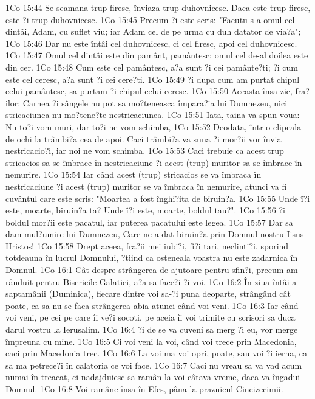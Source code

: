 1Co 15:44  Se seamana trup firesc, înviaza trup duhovnicesc. Daca este trup firesc, este ?i trup duhovnicesc.
1Co 15:45  Precum ?i este scris: "Facutu-s-a omul cel dintâi, Adam, cu suflet viu; iar Adam cel de pe urma cu duh datator de via?a";
1Co 15:46  Dar nu este întâi cel duhovnicesc, ci cel firesc, apoi cel duhovnicesc.
1Co 15:47  Omul cel dintâi este din pamânt, pamântesc; omul cel de-al doilea este din cer.
1Co 15:48  Cum este cel pamântesc, a?a sunt ?i cei pamânte?ti; ?i cum este cel ceresc, a?a sunt ?i cei cere?ti.
1Co 15:49  ?i dupa cum am purtat chipul celui pamântesc, sa purtam ?i chipul celui ceresc.
1Co 15:50  Aceasta însa zic, fra?ilor: Carnea ?i sângele nu pot sa mo?teneasca împara?ia lui Dumnezeu, nici stricaciunea nu mo?tene?te nestricaciunea.
1Co 15:51  Iata, taina va spun voua: Nu to?i vom muri, dar to?i ne vom schimba,
1Co 15:52  Deodata, într-o clipeala de ochi la trâmbi?a cea de apoi. Caci trâmbi?a va suna ?i mor?ii vor învia nestricacio?i, iar noi ne vom schimba.
1Co 15:53  Caci trebuie ca acest trup stricacios sa se îmbrace în nestricaciune ?i acest (trup) muritor sa se îmbrace în nemurire.
1Co 15:54  Iar când acest (trup) stricacios se va îmbraca în nestricaciune ?i acest (trup) muritor se va îmbraca în nemurire, atunci va fi cuvântul care este scris: "Moartea a fost înghi?ita de biruin?a.
1Co 15:55  Unde î?i este, moarte, biruin?a ta? Unde î?i este, moarte, boldul tau?".
1Co 15:56  ?i boldul mor?ii este pacatul, iar puterea pacatului este legea.
1Co 15:57  Dar sa dam mul?umire lui Dumnezeu, Care ne-a dat biruin?a prin Domnul nostru Iisus Hristos!
1Co 15:58  Drept aceea, fra?ii mei iubi?i, fi?i tari, neclinti?i, sporind totdeauna în lucrul Domnului, ?tiind ca osteneala voastra nu este zadarnica în Domnul.
1Co 16:1  Cât despre strângerea de ajutoare pentru sfin?i, precum am rânduit pentru Bisericile Galatiei, a?a sa face?i ?i voi.
1Co 16:2  În ziua întâi a saptamânii (Duminica), fiecare dintre voi sa-?i puna deoparte, strângând cât poate, ca sa nu se faca strângerea abia atunci când voi veni.
1Co 16:3  Iar când voi veni, pe cei pe care îi ve?i socoti, pe aceia îi voi trimite cu scrisori sa duca darul vostru la Ierusalim.
1Co 16:4  ?i de se va cuveni sa merg ?i eu, vor merge împreuna cu mine.
1Co 16:5  Ci voi veni la voi, când voi trece prin Macedonia, caci prin Macedonia trec.
1Co 16:6  La voi ma voi opri, poate, sau voi ?i ierna, ca sa ma petrece?i în calatoria ce voi face.
1Co 16:7  Caci nu vreau sa va vad acum numai în treacat, ci nadajduiesc sa ramân la voi câtava vreme, daca va îngadui Domnul.
1Co 16:8  Voi ramâne însa în Efes, pâna la praznicul Cincizecimii.
